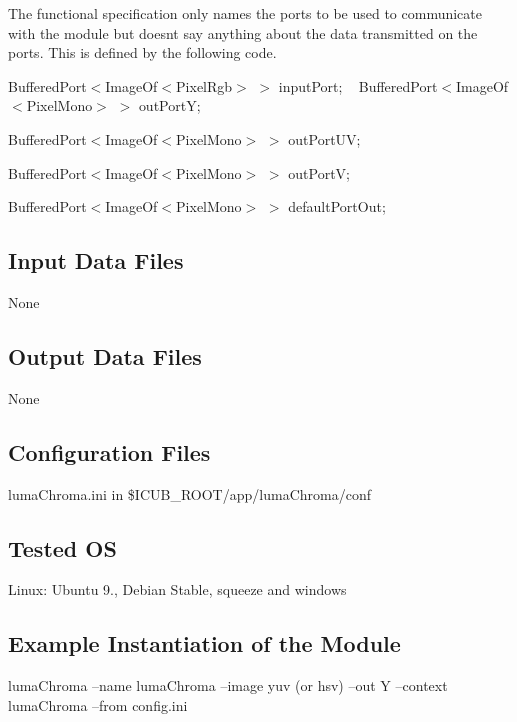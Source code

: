 The functional specification only names the ports to be used to communicate with the module but doesn\textquotesingle{}t say anything about the data transmitted on the ports. This is defined by the following code.

{\ttfamily Buffered\+Port$<$Image\+Of$<$\+Pixel\+Rgb$>$} $>$ {\ttfamily input\+Port}; ~\newline
 {\ttfamily Buffered\+Port$<$Image\+Of$<$\+Pixel\+Mono$>$} $>$ {\ttfamily out\+PortY};

{\ttfamily Buffered\+Port$<$Image\+Of$<$\+Pixel\+Mono$>$} $>$ {\ttfamily out\+Port\+UV};

{\ttfamily Buffered\+Port$<$Image\+Of$<$\+Pixel\+Mono$>$} $>$ {\ttfamily out\+PortV};

{\ttfamily Buffered\+Port$<$Image\+Of$<$\+Pixel\+Mono$>$} $>$ {\ttfamily default\+Port\+Out};\hypertarget{group__lumaChroma_in_files_sec}{}\subsection{Input Data Files}\label{group__lumaChroma_in_files_sec}
None\hypertarget{group__lumaChroma_out_data_sec}{}\subsection{Output Data Files}\label{group__lumaChroma_out_data_sec}
None\hypertarget{group__lumaChroma_conf_file_sec}{}\subsection{Configuration Files}\label{group__lumaChroma_conf_file_sec}
{\ttfamily luma\+Chroma.\+ini} in {\ttfamily \$\+I\+C\+U\+B\+\_\+\+R\+O\+OT/app/luma\+Chroma/conf} ~\newline
 \hypertarget{group__blobExtractor_tested_os_sec}{}\subsection{Tested OS}\label{group__blobExtractor_tested_os_sec}
Linux\+: Ubuntu 9., Debian Stable, squeeze and windows\hypertarget{group__lumaChroma_example_sec}{}\subsection{Example Instantiation of the Module}\label{group__lumaChroma_example_sec}
{\ttfamily luma\+Chroma --name luma\+Chroma --image yuv (or hsv) --out Y --context luma\+Chroma --from config.\+ini }

